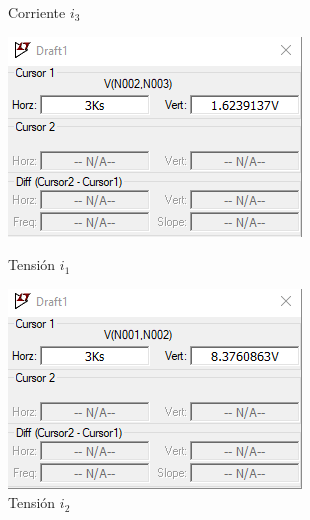 \documentclass[a4paper,12pt]{article}
\begin{document}
\begin{figure}[H]
\begin{minipage}{0.31\textwidth}
        \caption*{Corriente $i_3$}
    \end{minipage}
\end{figure}

\vspace{2cm}

\begin{figure}[H]
    \centering
    \begin{minipage}{0.4\textwidth}
        \centering
        \includegraphics[width=\linewidth]{imagenes/corrientei1lt.png}
        \caption*{Tensión $i_1$}
    \end{minipage}
    \hfill
    \begin{minipage}{0.4\textwidth}
        \centering
        \includegraphics[width=\linewidth]{imagenes/corrientei2lt.png}
        \caption*{Tensión $i_2$}
    \end{minipage}
\end{figure}
\end{document}
